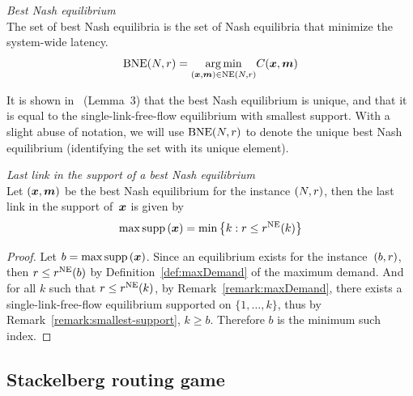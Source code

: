 \begin{definition}{\emph{Best Nash equilibrium}\\}
\label{def:BstNashEq}
The set of best Nash equilibria is the set of Nash equilibria that minimize the system-wide latency. 
\begin{equation}
\textup{BNE} (N, r) = \underset{(\boldsymbol {x}, \boldsymbol {m}) \in \textup{NE} (N, r)}{\arg\min} C(\boldsymbol {x}, \boldsymbol {m})
\end{equation}
\end{definition}

\begin{remark}
\label{remark:smallest-support}
It is shown in~\cite{krichene12} (Lemma~3) that the best Nash equilibrium is unique, and that it is equal to the single-link-free-flow equilibrium with smallest support. With a slight abuse of notation, we will use $\textup{BNE} (N, r)$ to denote the unique best Nash equilibrium (identifying the set with its unique element).
\end{remark}

\begin{proposition}\emph{Last link in the support of a best Nash equilibrium}\\
\label{prop:lastNash}
Let $(\boldsymbol {x}, \boldsymbol {m})$ be the best Nash equilibrium for the instance $(N, r)$, then the last link in the support of~$\boldsymbol {x}$ is given by
\begin{equation}
\max \textup{supp} \left( \boldsymbol {x} \right) = \min \left\{k: r \leq r^{\textup{NE}} ( k ) \right\}
\end{equation}
\end{proposition}

\begin{proof}
Let $b = \max \textup{supp} \left( \boldsymbol {x} \right)$. Since an equilibrium exists for the instance~$(b, r)$, then $r \leq r^{\textup{NE}} ( b )$ by Definition~\ref{def:maxDemand} of the maximum demand. And for all $k$ such that $r \leq r^{\textup{NE}} ( k )$, by Remark~\ref{remark:maxDemand}, there exists a single-link-free-flow equilibrium supported on  $\{1, \dots, k\}$, thus by Remark~\ref{remark:smallest-support}, $k \geq b$. Therefore $b$ is the minimum such index.
\end{proof}

\subsection{Stackelberg routing game}
\label{sec:previous-Stack}

